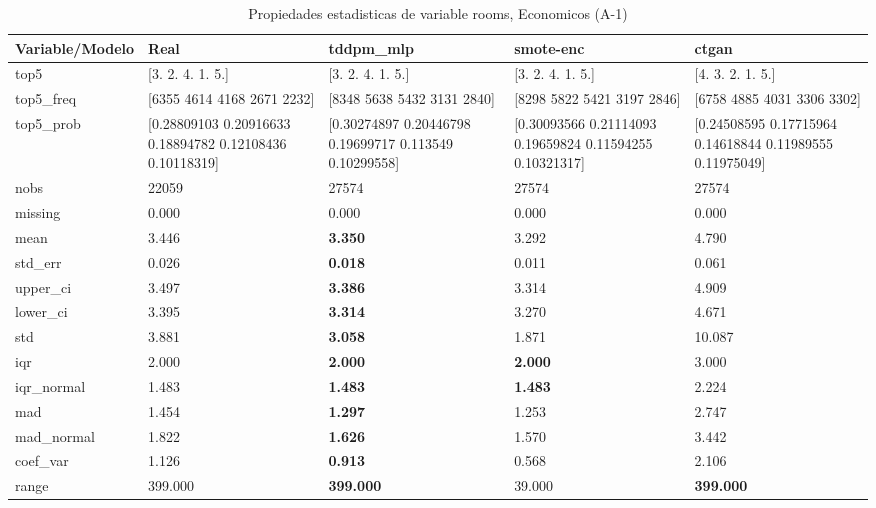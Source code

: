 \begin{table}[H]
\centering
\fontsize{8}{14}\selectfont
\caption{Propiedades  estadisticas de variable rooms, Economicos (A-1)}
\label{table-stats-economicos-a-1-rooms}
\begin{tabular}{|l|m{10em}|m{10em}|m{10em}|m{10em}|}
\hline
 \rowcolor[gray]{0.8}
Variable/Modelo & Real & tddpm\_mlp & smote-enc & ctgan \\
\hline top5 & [3. 2. 4. 1. 5.] & [3. 2. 4. 1. 5.] & [3. 2. 4. 1. 5.] & [4. 3. 2. 1. 5.] \\
\hline top5\_freq & [6355 4614 4168 2671 2232] & [8348 5638 5432 3131 2840] & [8298 5822 5421 3197 2846] & [6758 4885 4031 3306 3302] \\
\hline top5\_prob & [0.28809103 0.20916633 0.18894782 0.12108436 0.10118319] & [0.30274897 0.20446798 0.19699717 0.113549   0.10299558] & [0.30093566 0.21114093 0.19659824 0.11594255 0.10321317] & [0.24508595 0.17715964 0.14618844 0.11989555 0.11975049] \\
\hline nobs & 22059 & 27574 & 27574 & 27574 \\
\hline missing & 0.000 & 0.000 & 0.000 & 0.000 \\
\hline mean & 3.446 & \bfseries 3.350 & 3.292 & \cellcolor[rgb]{0.9, 0.54, 0.52} 4.790 \\
\hline std\_err & 0.026 & \bfseries 0.018 & 0.011 & \cellcolor[rgb]{0.9, 0.54, 0.52} 0.061 \\
\hline upper\_ci & 3.497 & \bfseries 3.386 & 3.314 & \cellcolor[rgb]{0.9, 0.54, 0.52} 4.909 \\
\hline lower\_ci & 3.395 & \bfseries 3.314 & 3.270 & \cellcolor[rgb]{0.9, 0.54, 0.52} 4.671 \\
\hline std & 3.881 & \bfseries 3.058 & 1.871 & \cellcolor[rgb]{0.9, 0.54, 0.52} 10.087 \\
\hline iqr & 2.000 & \bfseries 2.000 & \bfseries 2.000 & \cellcolor[rgb]{0.9, 0.54, 0.52} 3.000 \\
\hline iqr\_normal & 1.483 & \bfseries 1.483 & \bfseries 1.483 & \cellcolor[rgb]{0.9, 0.54, 0.52} 2.224 \\
\hline mad & 1.454 & \bfseries 1.297 & 1.253 & \cellcolor[rgb]{0.9, 0.54, 0.52} 2.747 \\
\hline mad\_normal & 1.822 & \bfseries 1.626 & 1.570 & \cellcolor[rgb]{0.9, 0.54, 0.52} 3.442 \\
\hline coef\_var & 1.126 & \bfseries 0.913 & 0.568 & \cellcolor[rgb]{0.9, 0.54, 0.52} 2.106 \\
\hline range & 399.000 & \bfseries 399.000 & \cellcolor[rgb]{0.9, 0.54, 0.52} 39.000 & \bfseries 399.000 \\

\end{tabular}
\end{table}
